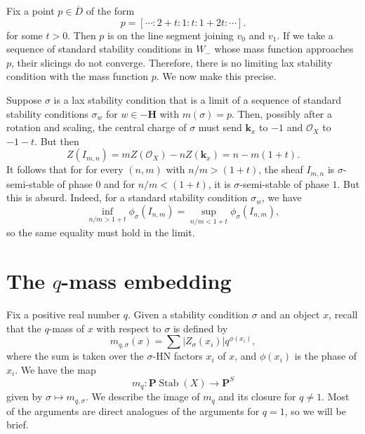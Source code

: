 \documentclass{amsart}
\begin{document}
Fix a point \(p \in \overline D\) of the form
\[ p = [ \cdots : 2 + t: 1: t : 1+2t : \cdots].\]
for some \(t > 0\).
Then \(p\) is on the line segment joining \(v_0\) and \(v_1\).
If we take a sequence of standard stability conditions in \(W_{-}\) whose mass function approaches \(p\), their slicings do not converge.
Therefore, there is no limiting lax stability condition with the mass function \(p\).
We now make this precise.

Suppose \(\sigma\) is a lax stability condition that is a limit of a sequence of standard stability conditions \(\sigma_w\) for \(w \in -\mathbf{H}\) with \(m(\sigma) = p\).
Then, possibly after a rotation and scaling, the central charge of \(\sigma\) must send \(\mathbf{k}_x\) to \(-1\) and \(\mathcal{O}_X\) to \(-1-t\).
But then
\[ Z(I_{m,n}) = mZ(\mathcal{O}_X) - n Z(\mathbf{k}_x) = n - m(1+t).\]
It follows that for for every \((n,m)\) with \(n/m > (1+t)\), the sheaf \(I_{m,n}\) is \(\sigma\)-semi-stable of phase \(0\) and for \(n/m < (1+t)\), it is \(\sigma\)-semi-stable of phase \(1\).
But this is absurd.
Indeed, for a standard stability condition \(\sigma_w\), we have
\[ \inf_{n/m > 1+t} \phi_{\sigma}(I_{n,m}) = \sup_{n/m < 1+t} \phi_{\sigma}(I_{n,m}),\]
so the same equality must hold in the limit.


\section{The \(q\)-mass embedding}\label{sec:qmass}
Fix a positive real number \(q\).
Given a stability condition \(\sigma\) and an object \(x\), recall that the \(q\)-mass of \(x\) with respect to \(\sigma\) is defined by
\[ m_{q, \sigma}(x) = \sum |Z_{\sigma}(x_i)| q^{\phi(x_i)},\]
where the sum is taken over the \(\sigma\)-HN factors \(x_i\) of \(x\), and \(\phi(x_i)\) is the phase of \(x_i\).
We have the map
\[ m_q \colon \mathbf{P} \operatorname{Stab}(X) \to \mathbf{P}^S\]
given by \(\sigma \mapsto m_{q,\sigma}\).
We describe the image of \(m_q\) and its closure for \(q \neq 1\).
Most of the arguments are direct analogues of the arguments for \(q = 1\), so we will be brief.
\end{document}
